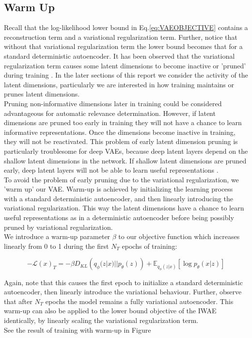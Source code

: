 \documentclass{article} %
\renewcommand{\L}{\mathcal{L}}
\begin{document}
\subsection{Warm Up}
Recall that the log-likelihood lower bound in Eq.\ref{eq:VAEOBJECTIVE} contains a reconstruction term and a variational regularization term. Further, notice that without that variational regularization term the lower bound becomes that for a standard deterministic autoencoder. It has been observed that the variational regularization term causes some latent dimensions to become inactive or 'pruned' during training \cite{MacKay2001, Burda2016}. In the later sections of this report we consider the activity of the latent dimensions, particularly we are interested in how training maintains or prunes latent dimensions. \\
Pruning non-informative dimensions later in training could be considered advantageous for automatic relevance determination. However, if latent dimensions are pruned too early in training they will not have a chance to learn informative representations. Once the dimensions become inactive in training, they will not be reactivated. This problem of early latent dimension pruning is particularly troublesome for deep VAEs, because deep latent layers depend on the shallow latent dimensions in the network. If shallow latent dimensions are pruned early,  deep latent layers will not be able to learn useful representations \cite{Sonderby2016}.\\
To avoid the problem of early pruning due to the variational regularization, we 'warm up' our VAE. Warm-up is achieved by initializing the learning process with a standard deterministic autoencoder, and then linearly introducing the variational regularization. This way the latent dimensions have a chance to learn useful representations as in a deterministic autoencoder before being possibly pruned by variational regularization.\\
We introduce a warm-up parameter $\beta$ to our objective function which increases linearly from 0 to 1 during the first $N_T$ epochs of training:

\begin{equation}
    -\L(x)_T=-\beta D_{KL}\left(q_\phi(z|x)||p_\theta(z)\right)+\mathbb{E}_{q_\phi(z|x)}\left[\log{p_\theta(x|z)}\right]
\end{equation}

Again, note that this causes the first epoch to initialize a standard deterministic autoencoder, then linearly introduce the variational behaviour. Further, observe that after $N_T$ epochs the model remains a fully variational autoencoder. This warm-up can also be applied to the lower bound objective of the IWAE identically, by linearly scaling the variational regularization term.\\
See the result of training with warm-up in Figure %
\end{document}
